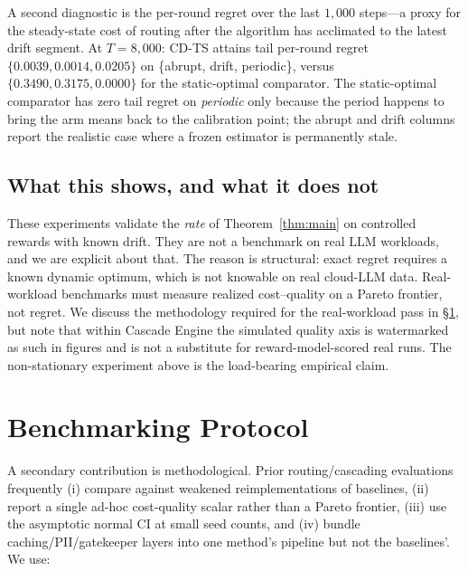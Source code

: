 \documentclass[11pt]{article}
\theoremstyle{definition}
\begin{document}
A second diagnostic is the per-round regret over the last $1{,}000$
steps---a proxy for the steady-state cost of routing after the algorithm
has acclimated to the latest drift segment. At $T = 8{,}000$: CD-TS
attains tail per-round regret $\{0.0039, 0.0014, 0.0205\}$ on
\{abrupt, drift, periodic\}, versus $\{0.3490, 0.3175, 0.0000\}$ for the
static-optimal comparator. The static-optimal comparator has zero tail
regret on \emph{periodic} only because the period happens to bring the
arm means back to the calibration point; the abrupt and drift columns
report the realistic case where a frozen estimator is permanently
stale.

\subsection{What this shows, and what it does not}

These experiments validate the \emph{rate} of Theorem~\ref{thm:main} on
controlled rewards with known drift. They are not a benchmark on real
LLM workloads, and we are explicit about that. The reason is structural:
exact regret requires a known dynamic optimum, which is not knowable on
real cloud-LLM data. Real-workload benchmarks must measure realized
cost--quality on a Pareto frontier, not regret. We discuss the
methodology required for the real-workload pass in
\S\ref{sec:protocol}, but note that within Cascade Engine the simulated
quality axis is watermarked as such in figures and is not a substitute
for reward-model-scored real runs. The non-stationary experiment above
is the load-bearing empirical claim.

\section{Benchmarking Protocol}
\label{sec:protocol}

A secondary contribution is methodological. Prior routing/cascading
evaluations frequently (i) compare against weakened reimplementations of
baselines, (ii) report a single ad-hoc cost-quality scalar rather than a
Pareto frontier, (iii) use the asymptotic normal CI at small seed counts,
and (iv) bundle caching/PII/gatekeeper layers into one method's pipeline
but not the baselines'. We use:
\end{document}
